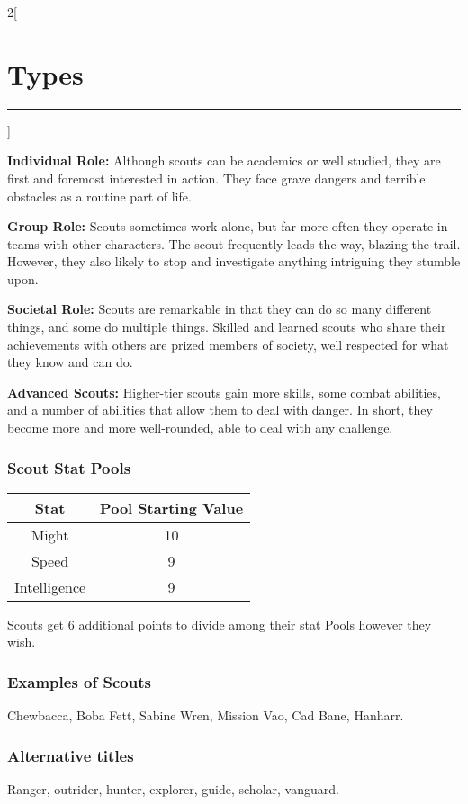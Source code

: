 \documentclass[a4paper,10pt,final]{book}
\newcommand{\HRule}{\rule{\linewidth}{0.5mm}} %
\newcommand{\newSection}[1]{\section*{#1} \addcontentsline{toc}{section}{#1} \label{sec:#1} \HRule}
\newcommand{\statPool}[5]
{
	\subsubsection*{#1 Stat Pools}
	\label{subsub:#1StatPools} 	
	\begin{center}
	\begin{tabular}{ |c|c| } 
	\hline
	\textbf{Stat} & \textbf{Pool Starting Value} \\ 
	\hline \hline
	Might & #2 \\ 
	\hline
 	Speed & #3  \\
 	\hline 
 	Intelligence & #4  \\ 
 	\hline
	\end{tabular}
	\end{center}
	#1s get #5 additional points to divide among their stat Pools however they wish.
}
\newcommand{\itemLine}[2]{\textbf{#1:} {#2}\par}
\newenvironment{docsection}[1]
{
  \begin{multicols*}{2}[\newSection{#1}]
}
{
  \end{multicols*}
  \newpage
}
\begin{document}
\begin{docsection}{Types}
\itemLine{Individual Role} {Although scouts can be academics or well studied, they are first and foremost interested in action. They face grave dangers and terrible obstacles as a routine part of life.}
\itemLine{Group Role} {Scouts sometimes work
alone, but far more often they operate in teams
with other characters. The scout frequently
leads the way, blazing the trail. However, they
also likely to stop and investigate anything
intriguing they stumble upon.}
\itemLine{Societal Role} {Scouts are remarkable in
that they can do so many different
things, and some do multiple
things. Skilled and learned scouts
who share their achievements with
others are prized members
of society, well respected for
what they know and can do.}
\itemLine{Advanced Scouts} {Higher-tier scouts
gain more skills, some combat abilities, and
a number of abilities that allow them to deal
with danger. In short, they become more
and more well-rounded, able to deal with
any challenge.}

\statPool{Scout}{10}{9}{9}{6}

\subsubsection*{Examples of Scouts}
\label{subsub:scoutExamples}
Chewbacca, Boba Fett, Sabine Wren, Mission Vao, Cad Bane, Hanharr.

\subsubsection*{Alternative titles}
\label{subsub:scoutAlternative}
Ranger, outrider, hunter, explorer, guide, scholar, vanguard.


\end{docsection}
\end{document}
